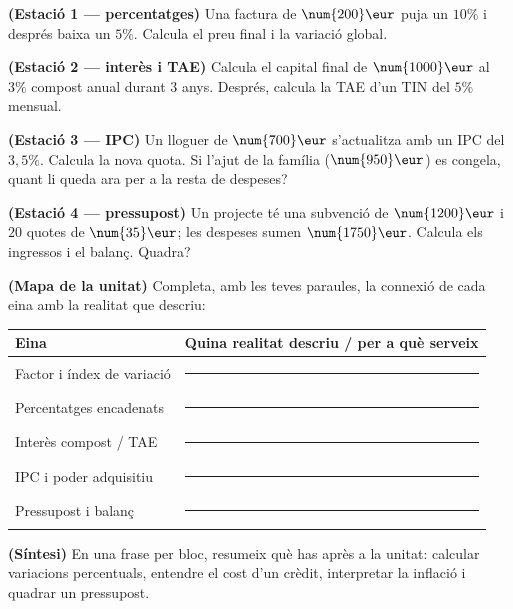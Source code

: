 \begin{exercicis}
\begin{exlist}
  \item \textbf{(Estació 1 — percentatges)} Una factura de $\num{200}\eur$ puja un
        $10\%$ i després baixa un $5\%$. Calcula el preu final i la variació global.
  \item \textbf{(Estació 2 — interès i TAE)} Calcula el capital final de $\num{1000}\eur$
        al $3\%$ compost anual durant $3$ anys. Després, calcula la TAE d'un TIN del
        $5\%$ mensual.
  \item \textbf{(Estació 3 — IPC)} Un lloguer de $\num{700}\eur$ s'actualitza amb un IPC
        del $3,5\%$. Calcula la nova quota. Si l'ajut de la família ($\num{950}\eur$) es
        congela, quant li queda ara per a la resta de despeses?
  \item \textbf{(Estació 4 — pressupost)} Un projecte té una subvenció de $\num{1200}\eur$
        i $20$ quotes de $\num{35}\eur$; les despeses sumen $\num{1750}\eur$. Calcula
        els ingressos i el balanç. Quadra?
  \item \textbf{(Mapa de la unitat)} Completa, amb les teves paraules, la connexió de
        cada eina amb la realitat que descriu:
        \begin{center}
        \renewcommand{\arraystretch}{1.4}
        \begin{tabular}{p{4.8cm} p{7.8cm}}
        \toprule
        \textbf{Eina} & \textbf{Quina realitat descriu / per a què serveix} \\
        \midrule
        Factor i índex de variació & \rule{7.2cm}{0.4pt} \\
        Percentatges encadenats & \rule{7.2cm}{0.4pt} \\
        Interès compost / TAE & \rule{7.2cm}{0.4pt} \\
        IPC i poder adquisitiu & \rule{7.2cm}{0.4pt} \\
        Pressupost i balanç & \rule{7.2cm}{0.4pt} \\
        \bottomrule
        \end{tabular}
        \end{center}
  \item \textbf{(Síntesi)} En una frase per bloc, resumeix què has après a la unitat:
        calcular variacions percentuals, entendre el cost d'un crèdit, interpretar la
        inflació i quadrar un pressupost.
\end{exlist}
\end{exercicis}

